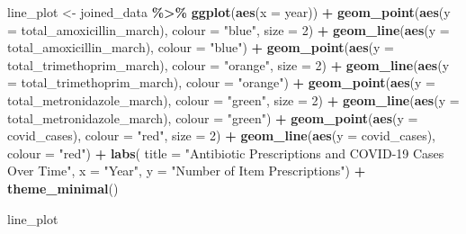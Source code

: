 \documentclass[
]{article}
\newenvironment{Shaded}{\begin{snugshade}}{\end{snugshade}}
\newcommand{\AttributeTok}[1]{\textcolor[rgb]{0.13,0.29,0.53}{#1}}
\newcommand{\DecValTok}[1]{\textcolor[rgb]{0.00,0.00,0.81}{#1}}
\newcommand{\FunctionTok}[1]{\textcolor[rgb]{0.13,0.29,0.53}{\textbf{#1}}}
\newcommand{\NormalTok}[1]{#1}
\newcommand{\OtherTok}[1]{\textcolor[rgb]{0.56,0.35,0.01}{#1}}
\newcommand{\SpecialCharTok}[1]{\textcolor[rgb]{0.81,0.36,0.00}{\textbf{#1}}}
\newcommand{\StringTok}[1]{\textcolor[rgb]{0.31,0.60,0.02}{#1}}
\begin{document}
\begin{Shaded}
\begin{Highlighting}[]
\NormalTok{line\_plot }\OtherTok{\textless{}{-}}\NormalTok{ joined\_data }\SpecialCharTok{\%\textgreater{}\%} 
  \FunctionTok{ggplot}\NormalTok{(}\FunctionTok{aes}\NormalTok{(}\AttributeTok{x =}\NormalTok{ year)) }\SpecialCharTok{+} 
    \FunctionTok{geom\_point}\NormalTok{(}\FunctionTok{aes}\NormalTok{(}\AttributeTok{y =}\NormalTok{ total\_amoxicillin\_march), }\AttributeTok{colour =} \StringTok{"blue"}\NormalTok{, }\AttributeTok{size =} \DecValTok{2}\NormalTok{) }\SpecialCharTok{+}
    \FunctionTok{geom\_line}\NormalTok{(}\FunctionTok{aes}\NormalTok{(}\AttributeTok{y =}\NormalTok{ total\_amoxicillin\_march), }\AttributeTok{colour =} \StringTok{"blue"}\NormalTok{) }\SpecialCharTok{+}
    \FunctionTok{geom\_point}\NormalTok{(}\FunctionTok{aes}\NormalTok{(}\AttributeTok{y =}\NormalTok{ total\_trimethoprim\_march), }\AttributeTok{colour =} \StringTok{"orange"}\NormalTok{, }\AttributeTok{size =} \DecValTok{2}\NormalTok{) }\SpecialCharTok{+}
    \FunctionTok{geom\_line}\NormalTok{(}\FunctionTok{aes}\NormalTok{(}\AttributeTok{y =}\NormalTok{ total\_trimethoprim\_march), }\AttributeTok{colour =} \StringTok{"orange"}\NormalTok{) }\SpecialCharTok{+}
    \FunctionTok{geom\_point}\NormalTok{(}\FunctionTok{aes}\NormalTok{(}\AttributeTok{y =}\NormalTok{ total\_metronidazole\_march), }\AttributeTok{colour =} \StringTok{"green"}\NormalTok{, }\AttributeTok{size =} \DecValTok{2}\NormalTok{) }\SpecialCharTok{+}
    \FunctionTok{geom\_line}\NormalTok{(}\FunctionTok{aes}\NormalTok{(}\AttributeTok{y =}\NormalTok{ total\_metronidazole\_march), }\AttributeTok{colour =} \StringTok{"green"}\NormalTok{) }\SpecialCharTok{+}
    \FunctionTok{geom\_point}\NormalTok{(}\FunctionTok{aes}\NormalTok{(}\AttributeTok{y =}\NormalTok{ covid\_cases), }\AttributeTok{colour =} \StringTok{"red"}\NormalTok{, }\AttributeTok{size =} \DecValTok{2}\NormalTok{) }\SpecialCharTok{+}
    \FunctionTok{geom\_line}\NormalTok{(}\FunctionTok{aes}\NormalTok{(}\AttributeTok{y =}\NormalTok{ covid\_cases), }\AttributeTok{colour =} \StringTok{"red"}\NormalTok{) }\SpecialCharTok{+}
    \FunctionTok{labs}\NormalTok{(}
        \AttributeTok{title =} \StringTok{"Antibiotic Prescriptions and COVID{-}19 Cases Over Time"}\NormalTok{,}
        \AttributeTok{x =} \StringTok{"Year"}\NormalTok{,}
        \AttributeTok{y =} \StringTok{"Number of Item Prescriptions"}\NormalTok{) }\SpecialCharTok{+}
    \FunctionTok{theme\_minimal}\NormalTok{() }

\NormalTok{line\_plot}
\end{Highlighting}
\end{Shaded}
\end{document}
